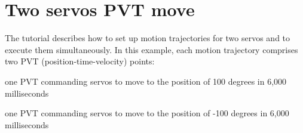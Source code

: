 \hypertarget{group__tutor__c__servomove2}{}\section{Two servos P\+VT move}
\label{group__tutor__c__servomove2}
The tutorial describes how to set up motion trajectories for two servos and to execute them simultaneously. In this example, each motion trajectory comprises two P\+VT (position-\/time-\/velocity) points\+: 
\begin{DoxyItemize}
\item one P\+VT commanding servos to move to the position of 100 degrees in 6,000 milliseconds 
\item one P\+VT commanding servos to move to the position of -\/100 degrees in 6,000 milliseconds
\end{DoxyItemize}


